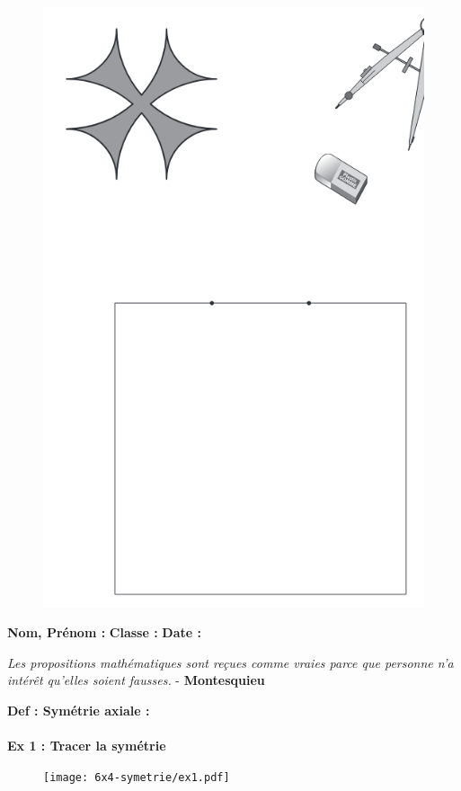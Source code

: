 \begin{figure}[H]
  \centering
  \includegraphics[width=0.8\linewidth]{6x4-symetrie/ex5b.png}
\end{figure}

\newpage

\textbf{Nom, Prénom :} \hspace{8cm} \textbf{Classe :} \hspace{3cm} \textbf{Date :}\\

\begin{center}
  \textit{Les propositions mathématiques sont reçues comme vraies parce que personne n’a intérêt qu’elles soient fausses.} - \textbf{Montesquieu}
\end{center}

\textbf{Def : Symétrie axiale : } \dotfill \\ \Pointilles[2] \\

\textbf{Ex 1 : Tracer la symétrie}

\begin{figure}[H]
  \centering
  \texttt{[image: 6x4-symetrie/ex1.pdf]}
\end{figure}

